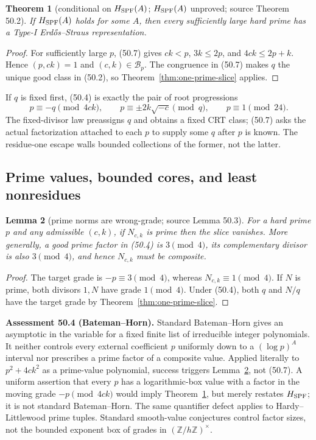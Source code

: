 \documentclass[10pt,reqno]{amsart}
\newtheorem{theorem}{Theorem}[section]
\newtheorem{lemma}[theorem]{Lemma}
\theoremstyle{definition}
\newcommand{\1}{\mathbf 1}
\begin{document}
\begin{theorem}[conditional on $H_{\rm SPF}(A)$; $H_{\rm SPF}(A)$ unproved;
source Theorem 50.2]
\label{thm:SPF}
If $H_{\rm SPF}(A)$ holds for some $A$, then every sufficiently large hard
prime has a Type-I Erd\H{o}s--Straus representation.
\end{theorem}
\begin{proof}
For sufficiently large $p$, (50.7) gives $ck<p$, $3k\leq2p$, and
$4ck\leq2p+k$.  Hence $(p,ck)=1$ and $(c,k)\in\mathcal B_p$.  The
congruence in (50.7) makes $q$ the unique good class in (50.2), so
Theorem~\ref{thm:one-prime-slice} applies.
\end{proof}
If $q$ is fixed first, (50.4) is exactly the pair of root progressions
\begin{equation}\tag{50.8}
 p\equiv-q\pmod {4ck},\qquad
 p\equiv\pm2k\sqrt{-c}\pmod q,
 \qquad p\equiv1\pmod {24}.
\end{equation}
The fixed-divisor law preassigns $q$ and obtains a fixed CRT class; (50.7)
asks the actual factorization attached to each $p$ to supply some $q$ after
$p$ is known.  The residue-one escape walls bounded collections of the
former, not the latter.

\subsection{Prime values, bounded cores, and least nonresidues}
\begin{lemma}[prime norms are wrong-grade; source Lemma 50.3]
\label{lem:prime-norm}
For a hard prime $p$ and any admissible $(c,k)$, if $N_{c,k}$ is prime then
the slice vanishes.  More generally, a good prime factor in (50.4) is
$3\pmod4$, its complementary divisor is also $3\pmod4$, and hence
$N_{c,k}$ must be composite.
\end{lemma}
\begin{proof}
The target grade is $-p\equiv3\pmod4$, whereas
$N_{c,k}\equiv1\pmod4$.  If $N$ is prime, both divisors $1,N$ have grade
$1\pmod4$.  Under (50.4), both $q$ and $N/q$ have the target grade by
Theorem~\ref{thm:one-prime-slice}.
\end{proof}

\medskip\noindent\textbf{Assessment 50.4 (Bateman--Horn).}
Standard Bateman--Horn gives an asymptotic in the variable for a fixed
finite list of irreducible integer polynomials.  It neither controls every
external coefficient $p$ uniformly down to a $(\log p)^A$ interval nor
prescribes a prime factor of a composite value.  Applied literally to
$p^2+4ck^2$ as a prime-value polynomial, success triggers
Lemma~\ref{lem:prime-norm}, not (50.7).  A uniform assertion that every $p$
has a logarithmic-box value with a factor in the moving grade
$-p\pmod {4ck}$ would imply Theorem~\ref{thm:SPF}, but merely restates
$H_{\rm SPF}$; it is not standard Bateman--Horn.  The same quantifier defect
applies to Hardy--Littlewood prime tuples.  Standard smooth-value
conjectures control factor sizes, not the bounded exponent box of grades in
$(\mathbb Z/h\mathbb Z)^\times$.
\end{document}
